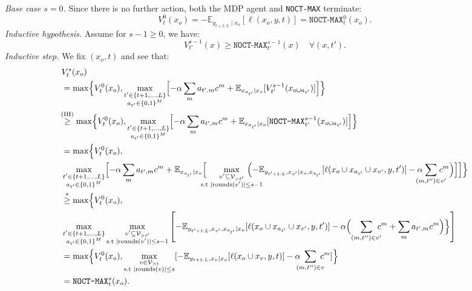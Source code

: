 \emph{Base case $s=0$.} Since there is no further action, both the MDP agent and \texttt{NOCT-MAX} terminate:
\begin{equation*}
V_{t}^0(x_o) =  -\mathbb{E}_{y_{t+1:L}\mid x_o}[\ell (x_o, y, t)] = \texttt{NOCT-MAX}^0_t(x_o).
\end{equation*}
\emph{Inductive hypothesis.} Assume for $s-1 \geq 0$, we have: 
\begin{equation}
V_{t'}^{s-1}(x) \geq \texttt{NOCT-MAX}^{s-1}_{t'}(x) \quad \forall (x,t').
\tag{IH}
\end{equation}
\emph{Inductive step.} We fix $(x_o, t)$ and see that: 
\begin{align*}
&V_t^s(x_o) 
\\ &= \max \Bigl\{V_t^0(x_o), \max_{\substack{t' \in \{t+1, ..., L\} \\ a_{t'} \in \{0,1\}^M}} \Bigl[ -\alpha \sum_{m} a_{t',m}c^m + \mathbb{E}_{x_{a_{t'}}\mid x_o} [V^{s-1}_{t'} (x_{o \cup a_{t'}} )]  \Bigr] \Bigr\}
\\
& \!\!\overset{(\text{IH})}{\geq} \max  \Bigl\{V_t^0(x_o), \max_{\substack{t' \in \{t+1, ..., L\} \\ a_{t'} \in \{0,1\}^M}} \Bigl[ -\alpha \sum_{m} a_{t',m}c^m + \mathbb{E}_{x_{a_{t'}}\mid x_o} [\texttt{NOCT-MAX}^{s-1}_{t'} (x_{o \cup a_{t'}} )]  \Bigr] \Bigr\}
\\
&= \max  \Bigl\{V_t^0(x_o), \\ &\max_{\substack{t' \in \{t+1, ..., L\} \\ a_{t'} \in \{0,1\}^M}} \Bigl[ -\alpha \sum_{m} a_{t',m}c^m + \mathbb{E}_{x_{a_{t'}}\mid x_o} \Bigl[\!\!\!\!\max_{\substack{v'\subseteq \mathcal{V}_{>t'} \\ \text{s.t } \mid\text{rounds}(v') \mid \leq s-1} }
\!\!\!\!\!\!\!\!\!\!\!\Bigl( - \mathbb{E}_{y_{t'+1:L}, x_{v'} \mid {x}_{o}, x_{a_{t'}} }[\ell (x_o \cup x_{a_{t'}}\cup x_{v'}, y, t')] - \alpha \!\!\!\!\!\! \sum_{(m, t'') \in v'} \!\!\!\!\!\!c^m \Bigr)\Bigr]  \Bigr] \Bigr\}
\\
&\overset{*}\geq \max  \Bigl\{V_t^0(x_o), \\
&\max_{\substack{t' \in \{t+1, ..., L\} \\ a_{t'} \in \{0,1\}^M}} \max_{\substack{v'\subseteq \mathcal{V}_{>t'} \\ \text{s.t } \mid\text{rounds}(v') \mid \leq s-1} }   \left [
- \mathbb{E}_{y_{t'+1:L}, x_{v'}, x_{a_{t'}}\mid {x}_{o} }[\ell (x_o \cup x_{a_{t'}}\cup x_{v'}, y, t')] - \alpha  \Bigl(\sum_{(m, t'') \in v'} \!\!\!\! c^m + \sum_{m} a_{t',m}c^m \Bigr ) \Bigr\} \right ]
\\
&= \max\Bigl\{V_t^0(x_o), \max_{\substack{v \in \mathcal{V}_{>t} \\ \text{s.t } |\text{rounds}(v)| \le s} } 
[ - \mathbb{E}_{y_{t+1:L}, x_v \mid {x}_{o} }[\ell (x_o \cup x_v, y, t)] - \alpha \!\!\!\! \sum_{(m, t'') \in v} \!\!\!\! c^m]\Bigr\}
\\
&= \texttt{NOCT-MAX}^{s}_{t} (x_o).
\end{align*}

